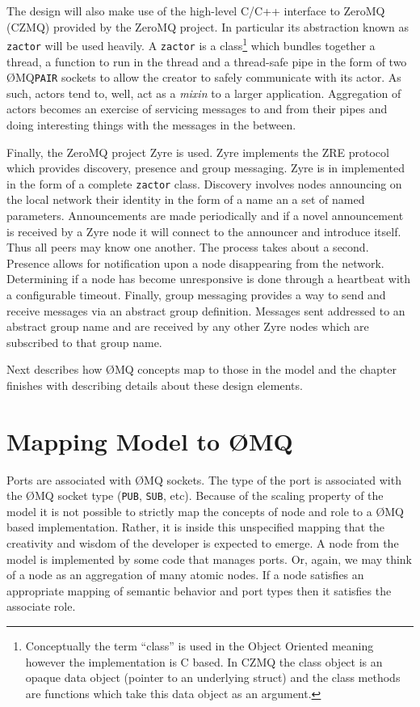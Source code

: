 \documentclass[letterpaper,oneside]{memoir}
\def\pair{\texttt{PAIR}\xspace}
\def\pub{\texttt{PUB}\xspace}
\def\sub{\texttt{SUB}\xspace}
\def\zactor{\texttt{zactor}\xspace}
\def\zmq{\O{}MQ\xspace}
\def\czmq{CZMQ\xspace}
\begin{document}
The design will also make use of the high-level C/C++ interface to ZeroMQ (\czmq) provided by the ZeroMQ project. 
In particular its abstraction known as \zactor will be used heavily.
A \zactor is a class\footnote{Conceptually the term ``class'' is used in the Object Oriented meaning however the implementation is C based. 
  In \czmq the class object is an opaque data object (pointer to an underlying struct) and the class methods are functions which take this data object as an argument.} which bundles together a thread, a function to run in the thread and a thread-safe pipe in the form of two \zmq \pair sockets to allow the creator to safely communicate with its actor.  As such, actors tend to, well, act as a \textit{mixin} to a larger application.  Aggregation of actors becomes an exercise of servicing messages to and from their pipes and doing interesting things with the messages in the between.

Finally, the ZeroMQ project Zyre is used. 
Zyre implements the ZRE protocol which provides discovery, presence and group messaging.
Zyre is in implemented in the form of a complete \zactor class.
Discovery involves nodes announcing on the local network their identity in the form of a name an a set of named parameters. 
Announcements are made periodically and if a novel announcement is received by a Zyre node it will connect to the announcer and introduce itself. 
Thus all peers may know one another. 
The process takes about a second.
Presence allows for notification upon a node disappearing from the network. 
Determining if a node has become unresponsive is done through a heartbeat with a configurable timeout.
Finally, group messaging provides a way to send and receive messages via an abstract group definition. 
Messages sent addressed to an abstract group name and are received by any other Zyre nodes which are subscribed to that group name.

Next describes how \zmq concepts map to those in the model and the chapter finishes with describing details about these design elements.

\section{Mapping Model to \zmq}

Ports are associated with \zmq sockets. 
The type of the port is associated with the \zmq socket type (\pub, \sub, etc). 
Because of the scaling property of the model it is not possible to strictly map the concepts of node and role to a \zmq based implementation. 
Rather, it is inside this unspecified mapping that the creativity and wisdom of the developer is expected to emerge. 
A node from the model is implemented by some code that manages ports. 
Or, again, we may think of a node as an aggregation of many atomic nodes.
If a node satisfies an appropriate mapping of semantic behavior and port types then it satisfies the associate role.
\end{document}
